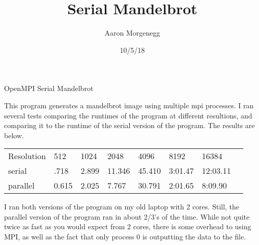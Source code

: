 \documentclass[12pt]{article}
\title{Serial Mandelbrot}
\author{Aaron Morgenegg}
\date{10/5/18}
\begin{document}
\maketitle

OpenMPI Serial Mandelbrot

This program generates a mandelbrot image using multiple mpi processes. I ran several tests comparing the runtimes of the program at different resultions, and comparing it to the runtime of the serial version of the program. The results are below.

\begin{table}[]
\begin{tabular}{llllllll}
Resolution & 512 & 1024 & 2048 & 4096 & 8192 & 16384\\
serial & .718 & 2.899 & 11.346 & 45.410 & 3:01.47 & 12:03.11 \\
parallel & 0.615 & 2.025 & 7.767 & 30.791 & 2:01.65 & 8:09.90 
\end{tabular}
\end{table}

I ran both versions of the program on my old laptop with 2 cores. Still, the parallel version of the program ran in about 2/3's of the time. While not quite twice as fast as you would expect from 2 cores, there is some overhead to using MPI, as well as the fact that only process 0 is outputting the data to the file.
\end{document}
